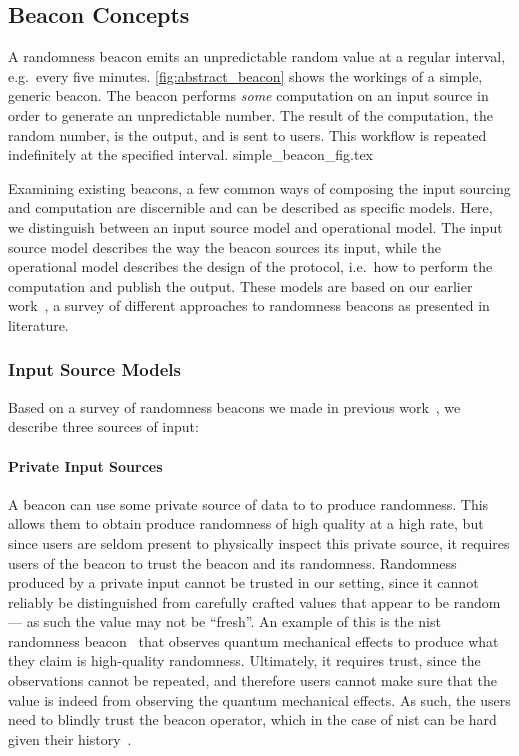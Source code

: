 \subsection{Beacon Concepts}

A randomness beacon emits an unpredictable random value at a regular interval, e.g.\ every five minutes.
\cref{fig:abstract_beacon} shows the workings of a simple, generic beacon.
The beacon performs \emph{some} computation on an input source in order to generate an unpredictable number.
The result of the computation, the random number, is the output, and is sent to users.
This workflow is repeated indefinitely at the specified interval.
{simple_beacon_fig.tex}

Examining existing beacons, a few common ways of composing the input sourcing and computation are discernible and can be described as specific models.
Here, we distinguish between an input source model and operational model.
The input source model describes the way the beacon sources its input, while the operational model describes the design of the protocol, i.e.\ how to perform the computation and publish the output.
These models are based on our earlier work~\cite{worldsbestpaper}, a survey of different approaches to randomness beacons as presented in literature.

\subsubsection{Input Source Models}
Based on a survey of randomness beacons we made in previous work~\cite{worldsbestpaper}, we describe three sources of input:

\paragraph{Private Input Sources}
A beacon can use some private source of data to to produce randomness.
This allows them to obtain produce randomness of high quality at a high rate, but since users are seldom present to physically inspect this private source, it requires users of the beacon to trust the beacon and its randomness.
Randomness produced by a private input cannot be trusted in our setting, since it cannot reliably be distinguished from carefully crafted values that appear to be random --- as such the value may not be \enquote{fresh}.
An example of this is the \gls{nist} randomness beacon~\cite{nistbeacon} that observes quantum mechanical effects to produce what they claim is high-quality randomness.
Ultimately, it requires trust, since the observations cannot be repeated, and therefore users cannot make sure that the value is indeed from observing the quantum mechanical effects.
As such, the users need to blindly trust the beacon operator, which in the case of \gls{nist} can be hard given their history~\cite{nist2014backdoor, nytimes-nsaconstants, nytimes-nsabackdoors}.

